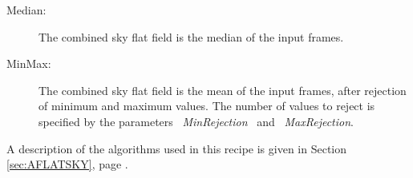 \begin{description}
\begin{description}
  \item [Median:]   The combined sky flat field is the median of the 
                    input frames.

  \item [MinMax:]   The combined sky flat field is the mean of the 
                    input frames, after
                    rejection of minimum and maximum values.
                    The number of values to reject is specified by the 
                    parameters \ {\it MinRejection} \ and \ {\it MaxRejection}.

\end{description}

\end{description}

A description of the algorithms used in this recipe is given in Section
\ref{sec:AFLATSKY}, page \pageref{sec:AFLATSKY}.

